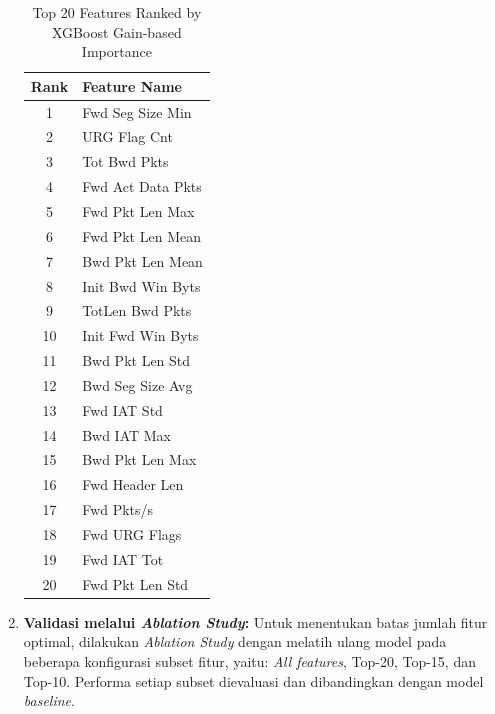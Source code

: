 \documentclass[11pt, a4paper]{article}
\begin{document}
\begin{enumerate}
    \begin{table}[htbp]
    \caption{Top 20 Features Ranked by XGBoost Gain-based Importance}
    \label{tab:feature_importance}
    \centering
    \vspace{0.2cm}
    \small
    \begin{tabular}{@{}cl@{}}
    \toprule
    \textbf{Rank} & \textbf{Feature Name} \\ \midrule
    1 & Fwd Seg Size Min \\
    2 & URG Flag Cnt \\
    3 & Tot Bwd Pkts \\
    4 & Fwd Act Data Pkts \\
    5 & Fwd Pkt Len Max \\
    6 & Fwd Pkt Len Mean \\
    7 & Bwd Pkt Len Mean \\
    8 & Init Bwd Win Byts \\
    9 & TotLen Bwd Pkts \\
    10 & Init Fwd Win Byts \\ \midrule
    11 & Bwd Pkt Len Std \\
    12 & Bwd Seg Size Avg \\
    13 & Fwd IAT Std \\
    14 & Bwd IAT Max \\
    15 & Bwd Pkt Len Max \\
    16 & Fwd Header Len \\
    17 & Fwd Pkts/s \\
    18 & Fwd URG Flags \\
    19 & Fwd IAT Tot \\
    20 & Fwd Pkt Len Std \\ \bottomrule
    \end{tabular}
    \end{table}

    
    
    
    \item \textbf{Validasi melalui \textit{Ablation Study}:} Untuk menentukan batas jumlah fitur optimal, dilakukan \textit{Ablation Study} dengan melatih ulang model pada beberapa konfigurasi subset fitur, yaitu: \textit{All features}, Top-20, Top-15, dan Top-10. Performa setiap subset dievaluasi dan dibandingkan dengan model \textit{baseline}.
    

\end{enumerate}
\end{document}
